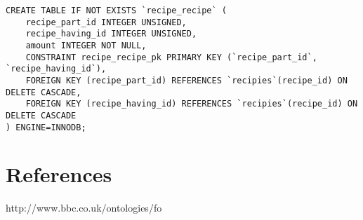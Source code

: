 \documentclass{article}
\begin{document}
\begin{lstlisting}[caption=Script of database]
CREATE TABLE IF NOT EXISTS `recipe_recipe` (
    recipe_part_id INTEGER UNSIGNED,
    recipe_having_id INTEGER UNSIGNED,
    amount INTEGER NOT NULL,
    CONSTRAINT recipe_recipe_pk PRIMARY KEY (`recipe_part_id`, `recipe_having_id`),
    FOREIGN KEY (recipe_part_id) REFERENCES `recipies`(recipe_id) ON DELETE CASCADE,
    FOREIGN KEY (recipe_having_id) REFERENCES `recipies`(recipe_id) ON DELETE CASCADE
) ENGINE=INNODB;

\end{lstlisting}
\section*{References}
http://www.bbc.co.uk/ontologies/fo
\end{document}
